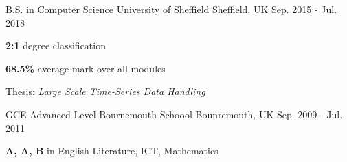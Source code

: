 

\begin{cventries}

  \cventry
    {B.S. in Computer Science} %
    {University of Sheffield} %
    {Sheffield, UK} %
    {Sep. 2015 - Jul. 2018} %
    {
      \begin{cvitems} %
      \item {\textbf{2:1} degree classification}
      \item {\textbf{68.5\%} average mark over all modules}
      \item {Thesis: \textit{Large Scale Time-Series Data Handling}}
      \end{cvitems}
    }

  \cventry
    {GCE Advanced Level} %
    {Bournemouth Schoool} %
    {Bounremouth, UK} %
    {Sep. 2009 - Jul. 2011} %
    {
      \begin{cvitems} %
      \item {\textbf{A, A, B} in English Literature, ICT, Mathematics}
      \end{cvitems}
    }

\end{cventries}
